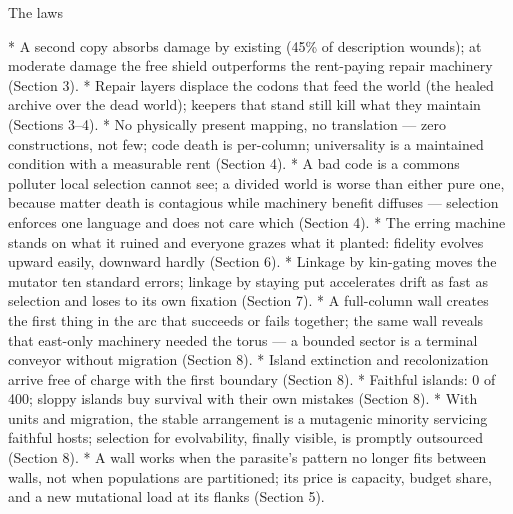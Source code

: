 \sec The laws

\begitems
*  A second copy
absorbs damage by existing (45\% of description wounds); at
moderate damage the free shield outperforms the rent-paying
repair machinery (Section 3).
*  Repair layers displace the codons that
feed the world (the healed archive over the dead world); keepers
that stand still kill what they maintain (Sections 3--4).
*  No physically
present mapping, no translation --- zero constructions, not few;
code death is per-column; universality is a maintained condition
with a measurable rent (Section 4).
*  A bad code is a commons polluter local
selection cannot see; a divided world is worse than either pure
one, because matter death is contagious while machinery benefit
diffuses --- selection enforces one language and does not care
which (Section 4).
* 
The erring machine stands on what it ruined and everyone grazes
what it planted: fidelity evolves upward easily, downward hardly
(Section 6).
*  Linkage by
kin-gating moves the mutator ten standard errors; linkage by
staying put accelerates drift as fast as selection and loses to
its own fixation (Section 7).
*  A
full-column wall creates the first thing in the arc that succeeds
or fails together; the same wall reveals that east-only machinery
needed the torus --- a bounded sector is a terminal conveyor
without migration (Section 8).
*  Island extinction and recolonization arrive free of
charge with the first boundary (Section 8).
* 
Faithful islands: 0 of 400; sloppy islands buy survival with
their own mistakes (Section 8).
*  With
units and migration, the stable arrangement is a mutagenic
minority servicing faithful hosts; selection for evolvability,
finally visible, is promptly outsourced (Section 8).
*  A wall works when the parasite's pattern no
longer fits between walls, not when populations are partitioned;
its price is capacity, budget share, and a new mutational load at
its flanks (Section 5).
\enditems

